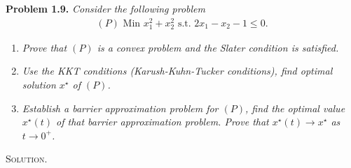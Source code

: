 \documentclass[a4paper]{article}
\numberwithin{equation}{section}
\begin{document}
\textbf{Problem 1.9.} \textit{Consider the following problem}
\begin{align}
\left( P \right) \mbox{ Min } x_1^2 + x_2^2\mbox{ s.t. } 2x_1 - x_2 - 1 \le 0.
\end{align}
\begin{enumerate}
\item \textit{Prove that $\left(P\right)$ is a convex problem and the Slater condition is satisfied.}
\item \textit{Use the KKT conditions (Karush-Kuhn-Tucker conditions), find optimal solution $x^\star$ of $\left(P\right)$.}
\item \textit{Establish a barrier approximation problem for $\left(P\right)$, find the optimal value $x^\star \left(t\right)$ of that barrier approximation problem. Prove that $x^\star \left(t\right) \to x^\star$ as $t\to 0^+$.}
\end{enumerate}
\textsc{Solution.}
\end{document}
